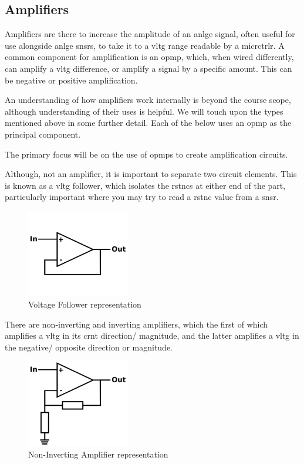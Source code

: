 \documentclass[a4paper,11pt]{report}
\begin{document}
\vspace*{1\baselineskip}

\subsection{Amplifiers}

Amplifiers are there to increase the amplitude of an \gls{anlge} signal, often useful for use alongside \gls{anlge} \gls{snsr}s, to take it to a \gls{vltg} range readable by a \gls{micrctrlr}. A common component for amplification is an \gls{opmp}, which, when wired differently, can amplify a \gls{vltg} difference, or amplify a signal by a specific amount. This can be negative or positive amplification.

An understanding of how amplifiers work internally is beyond the course scope, although understanding of their uses is helpful. We will touch upon the types mentioned above in some further detail. Each of the below uses an \gls{opmp} as the principal component.

The primary focus will be on the use of \gls{opmp}s to create amplification circuits.

Although, not an amplifier, it is important to separate two circuit elements. This is known as a \gls{vltg} follower, which isolates the \gls{rstnc}s at either end of the part, particularly important where you may try to read a \gls{rstnc} value from a \gls{snsr}.

\begin{figure}[H]
\centering
\includegraphics[width=0.4\textwidth]{voltagefollower}
\caption{Voltage Follower representation}
\end{figure}

There are non-inverting and inverting amplifiers, which the first of which amplifies a \gls{vltg} in its \gls{crnt} direction/ magnitude, and the latter amplifies a \gls{vltg} in the negative/ opposite direction or magnitude.

\begin{figure}[H]
\centering
\includegraphics[width=0.4\textwidth]{noninvertingamp}
\caption{Non-Inverting Amplifier representation}
\end{figure}
\end{document}
